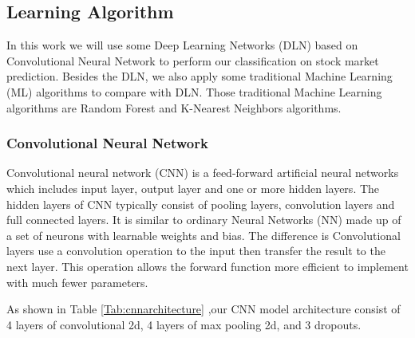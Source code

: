 \documentclass[12pt]{article}
\begin{document}
\subsection{Learning Algorithm}
In this work we will use some Deep Learning Networks (DLN) based on Convolutional Neural Network to perform our classification on stock market prediction. Besides the DLN, we also apply some traditional Machine Learning (ML) algorithms to compare with DLN. Those traditional Machine Learning algorithms are Random Forest and K-Nearest Neighbors algorithms.

\subsubsection{Convolutional Neural Network}

 \begin{table}[H]
 \centering
 \caption{Our proposed CNN architecture.}
 \label{Tab:cnnarchitecture}
 \end{table}
Convolutional neural network (CNN) is a feed-forward artificial neural networks which includes input layer, output layer and one or more hidden layers. The hidden layers of CNN typically consist of pooling layers, convolution layers and full connected layers. It is similar to ordinary Neural Networks (NN) made up of a set of neurons with learnable weights and bias. The difference is Convolutional layers use a convolution operation to the input then transfer the result to the next layer. This operation allows the forward function more efficient to implement with much fewer parameters.
\par
As shown in Table \ref{Tab:cnnarchitecture} ,our CNN model architecture consist of 4 layers of convolutional 2d, 4 layers of max pooling 2d, and 3 dropouts.
\end{document}
